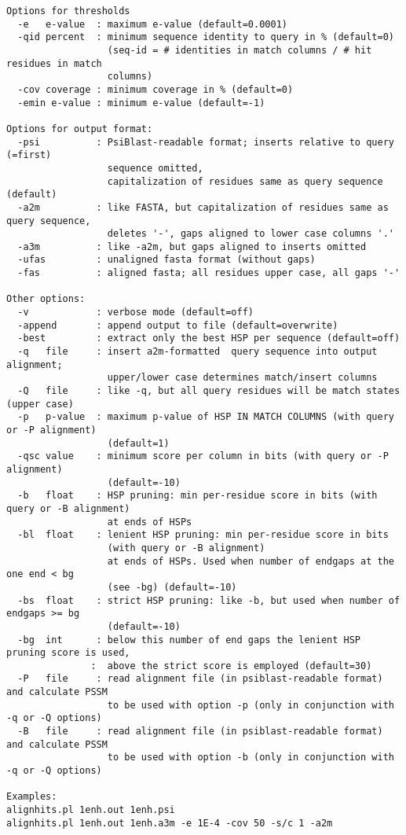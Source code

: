 \documentclass[11pt,a4paper]{article}
\begin{document}
\small \begin{verbatim}
Options for thresholds
  -e   e-value  : maximum e-value (default=0.0001)
  -qid percent  : minimum sequence identity to query in % (default=0) 
                  (seq-id = # identities in match columns / # hit residues in match
                  columns)
  -cov coverage : minimum coverage in % (default=0) 
  -emin e-value : minimum e-value (default=-1)

Options for output format:
  -psi          : PsiBlast-readable format; inserts relative to query (=first) 
                  sequence omitted, 
                  capitalization of residues same as query sequence (default)
  -a2m          : like FASTA, but capitalization of residues same as query sequence,
                  deletes '-', gaps aligned to lower case columns '.'
  -a3m          : like -a2m, but gaps aligned to inserts omitted
  -ufas         : unaligned fasta format (without gaps)
  -fas          : aligned fasta; all residues upper case, all gaps '-'

Other options:
  -v            : verbose mode (default=off)
  -append       : append output to file (default=overwrite)
  -best         : extract only the best HSP per sequence (default=off)
  -q   file     : insert a2m-formatted  query sequence into output alignment;
                  upper/lower case determines match/insert columns
  -Q   file     : like -q, but all query residues will be match states (upper case)
  -p   p-value  : maximum p-value of HSP IN MATCH COLUMNS (with query or -P alignment) 
                  (default=1)
  -qsc value    : minimum score per column in bits (with query or -P alignment) 
                  (default=-10) 
  -b   float    : HSP pruning: min per-residue score in bits (with query or -B alignment) 
                  at ends of HSPs
  -bl  float    : lenient HSP pruning: min per-residue score in bits 
                  (with query or -B alignment)
                  at ends of HSPs. Used when number of endgaps at the one end < bg 
                  (see -bg) (default=-10)
  -bs  float    : strict HSP pruning: like -b, but used when number of endgaps >= bg 
                  (default=-10)
  -bg  int      : below this number of end gaps the lenient HSP pruning score is used,
               :  above the strict score is employed (default=30)
  -P   file     : read alignment file (in psiblast-readable format) and calculate PSSM
                  to be used with option -p (only in conjunction with -q or -Q options)
  -B   file     : read alignment file (in psiblast-readable format) and calculate PSSM
                  to be used with option -b (only in conjunction with -q or -Q options)

Examples: 
alignhits.pl 1enh.out 1enh.psi
alignhits.pl 1enh.out 1enh.a3m -e 1E-4 -cov 50 -s/c 1 -a2m
\end{verbatim} \normalsize
\end{document}
